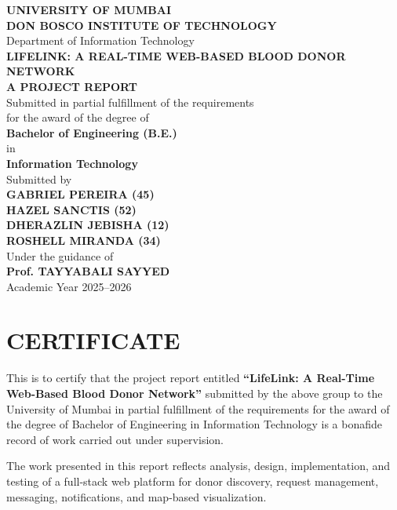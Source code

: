 \documentclass[12pt,a4paper]{report}
\begin{document}
\begin{titlepage}
\begin{center}
{\Large \textbf{UNIVERSITY OF MUMBAI}}\\[8pt]
{\large \textbf{DON BOSCO INSTITUTE OF TECHNOLOGY}}\\
Department of Information Technology\\[16pt]

{\LARGE \textbf{LIFELINK: A REAL-TIME WEB-BASED BLOOD DONOR NETWORK}}\\[16pt]
{\large \textbf{A PROJECT REPORT}}\\[10pt]
Submitted in partial fulfillment of the requirements\\
for the award of the degree of\\
\textbf{Bachelor of Engineering (B.E.)}\\
in\\
\textbf{Information Technology}\\[14pt]

Submitted by\\[4pt]
\textbf{GABRIEL PEREIRA (45)}\\
\textbf{HAZEL SANCTIS (52)}\\
\textbf{DHERAZLIN JEBISHA (12)}\\
\textbf{ROSHELL MIRANDA (34)}\\[12pt]

Under the guidance of\\
\textbf{Prof. TAYYABALI SAYYED}\\[16pt]

Academic Year 2025--2026
\end{center}
\end{titlepage}

\chapter*{CERTIFICATE}
This is to certify that the project report entitled \textbf{``LifeLink: A Real-Time Web-Based Blood Donor Network''} submitted by the above group to the University of Mumbai in partial fulfillment of the requirements for the award of the degree of Bachelor of Engineering in Information Technology is a bonafide record of work carried out under supervision.

The work presented in this report reflects analysis, design, implementation, and testing of a full-stack web platform for donor discovery, request management, messaging, notifications, and map-based visualization.
\end{document}

